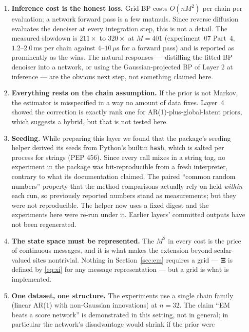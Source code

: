 \documentclass[11pt]{article}
\theoremstyle{remark}
\newcommand{\Xibf}{\bm{\Xi}}
\begin{document}
\begin{enumerate}[leftmargin=*]
\item \textbf{Inference cost is the honest loss.} Grid BP costs $O(nM^2)$ per
  chain per evaluation; a network forward pass is a few matmuls. Since reverse
  diffusion evaluates the denoiser at every integration step, this is not a
  detail. The measured slowdown is $211\times$ to $320\times$ at $M = 401$
  (experiment~07 Part~4, $1.2$--$2.0$\,ms per chain against $4$--$10\,\mu$s for a
  forward pass) and is reported as prominently as the wins. The natural
  responses --- distilling the fitted BP denoiser into a network, or using the
  Gaussian-projected BP of Layer 2 at inference --- are the obvious next step,
  not something claimed here.
\item \textbf{Everything rests on the chain assumption.} If the prior is not
  Markov, the estimator is misspecified in a way no amount of data fixes.
  Layer~4 showed the correction is exactly rank one for AR(1)-plus-global-latent
  priors, which suggests a hybrid, but that is not tested here.
\item \textbf{Seeding.} While preparing this layer we found that the package's
  seeding helper derived its seeds from Python's builtin \texttt{hash}, which is
  salted per process for strings (PEP 456). Since every call mixes in a string
  tag, no experiment in the package was bit-reproducible from a fresh
  interpreter, contrary to what its documentation claimed. The paired
  ``common random numbers'' property that the method comparisons actually rely
  on held \emph{within} each run, so previously reported numbers stand as
  measurements; but they were not reproducible. The helper now uses a fixed
  digest and the experiments here were re-run under it. Earlier layers'
  committed outputs have not been regenerated.
\item \textbf{The state space must be represented.} The $M^2$ in every cost is
  the price of continuous messages, and it is what makes the extension beyond
  scalar-valued sites nontrivial. Nothing in Section~\ref{sec:em} requires a
  grid --- $\Xibf$ is defined by \eqref{eq:xi} for any message representation ---
  but a grid is what is implemented.
\item \textbf{One dataset, one structure.} The experiments use a single chain
  family (linear AR(1) with non-Gaussian innovations) at $n = 32$. The claim
  ``EM beats a score network'' is demonstrated in this setting, not in general;
  in particular the network's disadvantage would shrink if the prior were

\end{enumerate}
\end{document}
